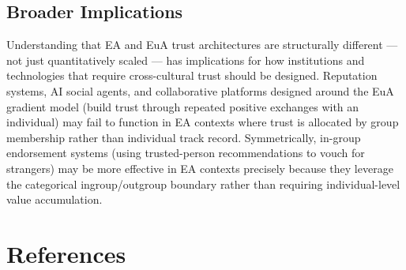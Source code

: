 \documentclass[11pt,a4paper]{article}
\begin{document}
\subsection{Broader Implications}

Understanding that EA and EuA trust architectures are structurally different — not just
quantitatively scaled — has implications for how institutions and technologies that require
cross-cultural trust should be designed. Reputation systems, AI social agents, and
collaborative platforms designed around the EuA gradient model (build trust through
repeated positive exchanges with an individual) may fail to function in EA contexts where
trust is allocated by group membership rather than individual track record. Symmetrically,
in-group endorsement systems (using trusted-person recommendations to vouch for strangers)
may be more effective in EA contexts precisely because they leverage the categorical
ingroup/outgroup boundary rather than requiring individual-level value accumulation.

\section*{References}


\end{document}
